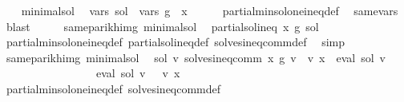 \begin{isabellebody}
\ \ \isamarkupfalse%
\ minimal{\isacharunderscore}{\kern0pt}sol\ \isamarkupfalse%
\ {\isachardoublequoteopen}vars\ sol\ {\isasymsubseteq}\ vars\ g\ {\isacharminus}{\kern0pt}\ {\isacharbraceleft}{\kern0pt}x{\isacharbraceright}{\kern0pt}{\isachardoublequoteclose}\isanewline
\ \ \ \ \isamarkupfalse%
\ partial{\isacharunderscore}{\kern0pt}min{\isacharunderscore}{\kern0pt}sol{\isacharunderscore}{\kern0pt}one{\isacharunderscore}{\kern0pt}ineq{\isacharunderscore}{\kern0pt}def\ \isamarkupfalse%
\ same{\isacharunderscore}{\kern0pt}vars\ \isamarkupfalse%
\ blast\isanewline
\ \ \isamarkupfalse%
\ \isamarkupfalse%
\ same{\isacharunderscore}{\kern0pt}parikh{\isacharunderscore}{\kern0pt}img\ minimal{\isacharunderscore}{\kern0pt}sol\ \isamarkupfalse%
\ {\isachardoublequoteopen}partial{\isacharunderscore}{\kern0pt}sol{\isacharunderscore}{\kern0pt}ineq\ x\ g\ sol{\isachardoublequoteclose}\isanewline
\ \ \ \ \isamarkupfalse%
\ partial{\isacharunderscore}{\kern0pt}min{\isacharunderscore}{\kern0pt}sol{\isacharunderscore}{\kern0pt}one{\isacharunderscore}{\kern0pt}ineq{\isacharunderscore}{\kern0pt}def\ partial{\isacharunderscore}{\kern0pt}sol{\isacharunderscore}{\kern0pt}ineq{\isacharunderscore}{\kern0pt}def\ solves{\isacharunderscore}{\kern0pt}ineq{\isacharunderscore}{\kern0pt}comm{\isacharunderscore}{\kern0pt}def\ \isamarkupfalse%
\ simp\isanewline
\ \ \isamarkupfalse%
\ \isamarkupfalse%
\ same{\isacharunderscore}{\kern0pt}parikh{\isacharunderscore}{\kern0pt}img\ minimal{\isacharunderscore}{\kern0pt}sol\ \isamarkupfalse%
\ {\isachardoublequoteopen}{\isasymforall}sol{\isacharprime}{\kern0pt}\ v{\isacharprime}{\kern0pt}{\isachardot}{\kern0pt}\ solves{\isacharunderscore}{\kern0pt}ineq{\isacharunderscore}{\kern0pt}comm\ x\ g\ v{\isacharprime}{\kern0pt}\ {\isasymand}\ v{\isacharprime}{\kern0pt}\ x\ {\isacharequal}{\kern0pt}\ eval\ sol{\isacharprime}{\kern0pt}\ v{\isacharprime}{\kern0pt}\isanewline
\ \ \ \ \ \ \ \ \ \ \ \ \ \ \ {\isasymlongrightarrow}\ {\isasymPsi}\ {\isacharparenleft}{\kern0pt}eval\ sol\ v{\isacharprime}{\kern0pt}{\isacharparenright}{\kern0pt}\ {\isasymsubseteq}\ {\isasymPsi}\ {\isacharparenleft}{\kern0pt}v{\isacharprime}{\kern0pt}\ x{\isacharparenright}{\kern0pt}{\isachardoublequoteclose}\isanewline
\ \ \ \ \isamarkupfalse%
\ partial{\isacharunderscore}{\kern0pt}min{\isacharunderscore}{\kern0pt}sol{\isacharunderscore}{\kern0pt}one{\isacharunderscore}{\kern0pt}ineq{\isacharunderscore}{\kern0pt}def\ solves{\isacharunderscore}{\kern0pt}ineq{\isacharunderscore}{\kern0pt}comm{\isacharunderscore}{\kern0pt}def\ \isamarkupfalse%

\end{isabellebody}
